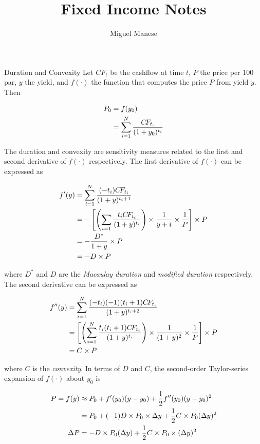 \documentclass{article}
\title{Fixed Income Notes}
\author{Miguel Manese}
\date{}
\newcommand{\CF}{C\!F}
\begin{document}
\maketitle

\begin{section}{Duration and Convexity}
Let $\CF_t$ be the cashflow at time $t$, $P$ the price per 100 par, $y$ the
yield, and $f(\cdot)$ the function that computes the price $P$ from yield
$y$. Then

\begin{align}
P_0 &= f(y_0) \notag\\
  &= \sum_{i=1}^N \frac{\CF_{t_{i}}}{(1 + y_0)^{t_{i}}} \notag
\end{align}

The duration and convexity are sensitivity measures related to the first
and second derivative of $f(\cdot)$ respectively. The first derivative of
$f(\cdot)$ can be expressed as

\begin{align}
f'(y) &= \sum_{i=1}^N \frac{(- t_i) \CF_{t_{i}}}{(1 + y)^{t_i + 1}} \notag\\
      &= - \left[\left(\sum_{i=1} \frac{t_i \CF_{t_{i}}}{(1 + y)^{t_i}} \right)
        \times \frac{1}{y + i} \times \frac{1}{P}\right] \times P \notag\\
      &= - \frac{D^*}{1 + y} \times P \notag\\
      &= - D \times P \notag
\end{align}

\noindent where $D^{*}$ and $D$ are the \emph{Macaulay duration} and 
\emph{modified duration} respectively. The second derivative can be expressed
as

\begin{align}
f''(y) &= \sum_{i=1}^N \frac{(- t_i) (-1)(t_i + 1) 
   \CF_{t_{i}}}{(1 + y)^{t_i + 2}} \notag\\
      &= \left[\left(\sum_{i=1}^N \frac{t_i (t_i + 1) \CF_{t_{i}}}{(1 + y)^{t_i}}
        \right) \times \frac{1}{(1 + y)^2} \times \frac{1}{P}\right]
        \times P \notag\\
      &= C \times P \notag
\end{align}

\noindent where $C$ is the \emph{convexity}. In terms of $D$ and $C$, the
second-order Taylor-series expansion of $f(\cdot)$ about $y_0$ is

\begin{align}
P = f(y) &\approx P_0 + f'(y_0) (y - y_0) + \frac{1}{2} f''(y_0) (y - y_0)^2
  \notag\\
     &= P_0 + (-1) D \times P_0 \times \Delta y + 
        \frac{1}{2} C \times P_0 (\Delta y)^2 \notag\\
\Delta P &= - D \times P_0 (\Delta y) + \frac{1}{2} C \times P_0 \times (\Delta y)^2
  \notag
\end{align}


\end{section}
\end{document}
